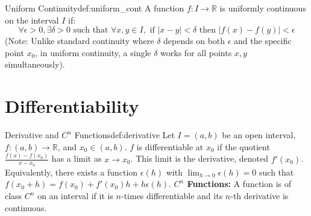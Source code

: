 \documentclass[11pt, a4paper]{article}
\begin{document}
\begin{definition}{Uniform Continuity}{def:uniform_cont}
A function $f: I \to \mathbb{R}$ is uniformly continuous on the interval $I$ if:
$$ \forall \epsilon > 0, \exists \delta > 0 \text{ such that } \forall x,y \in I, \text{ if } |x - y| < \delta \text{ then } |f(x) - f(y)| < \epsilon $$
(Note: Unlike standard continuity where $\delta$ depends on both $\epsilon$ and the specific point $x_0$, in uniform continuity, a single $\delta$ works for all points $x,y$ simultaneously).
\end{definition}

\section{Differentiability}

\begin{definition}{Derivative and $C^n$ Functions}{def:derivative}
Let $I = (a,b)$ be an open interval, $f: (a,b) \to \mathbb{R}$, and $x_0 \in (a,b)$. $f$ is differentiable at $x_0$ if the quotient $\frac{f(x) - f(x_0)}{x - x_0}$ has a limit as $x \to x_0$. This limit is the derivative, denoted $f'(x_0)$. 
Equivalently, there exists a function $\epsilon(h)$ with $\lim_{h \to 0} \epsilon(h) = 0$ such that $f(x_0 + h) = f(x_0) + f'(x_0)h + h\epsilon(h)$.
\textbf{$C^n$ Functions:} A function is of class $C^n$ on an interval if it is $n$-times differentiable and its $n$-th derivative is continuous.
\end{definition}
\end{document}
